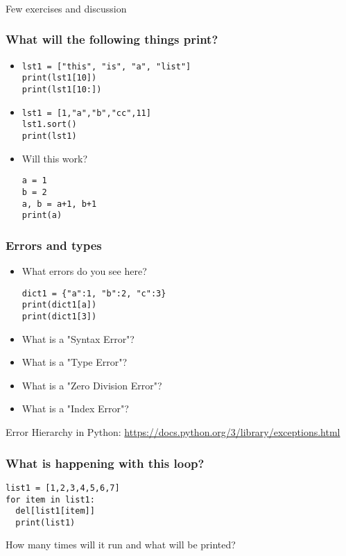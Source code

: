 \documentclass{beamer}
\begin{document}
\begin{frame}
\frametitle{}
\begin{center}
Few exercises and discussion
\end{center}
\end{frame}

\begin{frame}[fragile]
\frametitle{What will the following things print?}
\begin{itemize}
\item 
\begin{verbatim}
lst1 = ["this", "is", "a", "list"]
print(lst1[10])
print(lst1[10:])
\end{verbatim} \pause
\item 
\begin{verbatim}
lst1 = [1,"a","b","cc",11]
lst1.sort()
print(lst1)
\end{verbatim} \pause
\item Will this work?
\begin{verbatim}
a = 1
b = 2
a, b = a+1, b+1
print(a)
\end{verbatim}
\end{itemize}
\end{frame}

\begin{frame}[fragile]
\frametitle{Errors and types}
\begin{itemize}
\item What errors do you see here?
\begin{verbatim}
dict1 = {"a":1, "b":2, "c":3}
print(dict1[a])
print(dict1[3])
\end{verbatim} \pause
\item What is a "Syntax Error"?
\item What is a "Type Error"?
\item What is a "Zero Division Error"?
\item What is a "Index Error"?
\end{itemize}
Error Hierarchy in Python: \url{https://docs.python.org/3/library/exceptions.html}
\end{frame}

\begin{frame}[fragile]
\frametitle{What is happening with this loop?}
\begin{verbatim}
list1 = [1,2,3,4,5,6,7]
for item in list1:
  del[list1[item]]
  print(list1)
\end{verbatim}
How many times will it run and what will be printed?
\end{frame}
\end{document}
